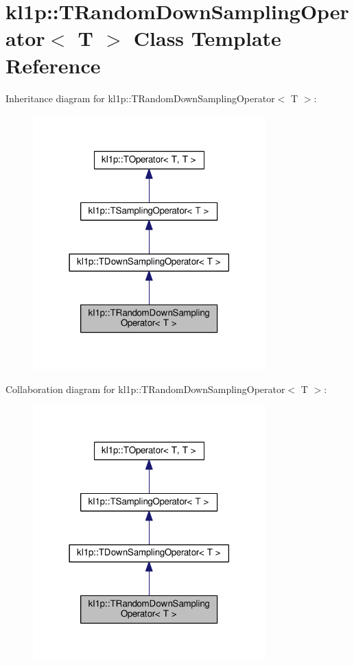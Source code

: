 \hypertarget{classkl1p_1_1TRandomDownSamplingOperator}{}\section{kl1p\+:\+:T\+Random\+Down\+Sampling\+Operator$<$ T $>$ Class Template Reference}
\label{classkl1p_1_1TRandomDownSamplingOperator}


Inheritance diagram for kl1p\+:\+:T\+Random\+Down\+Sampling\+Operator$<$ T $>$\+:
\nopagebreak
\begin{figure}[H]
\begin{center}
\leavevmode
\includegraphics[width=254pt]{classkl1p_1_1TRandomDownSamplingOperator__inherit__graph}
\end{center}
\end{figure}


Collaboration diagram for kl1p\+:\+:T\+Random\+Down\+Sampling\+Operator$<$ T $>$\+:
\nopagebreak
\begin{figure}[H]
\begin{center}
\leavevmode
\includegraphics[width=254pt]{classkl1p_1_1TRandomDownSamplingOperator__coll__graph}
\end{center}
\end{figure}
